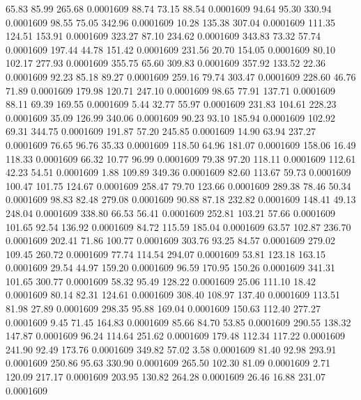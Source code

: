   65.83   85.99  265.68   0.0001609
  88.74   73.15   88.54   0.0001609
  94.64   95.30  330.94   0.0001609
  98.55   75.05  342.96   0.0001609
  10.28  135.38  307.04   0.0001609
 111.35  124.51  153.91   0.0001609
 323.27   87.10  234.62   0.0001609
 343.83   73.32   57.74   0.0001609
 197.44   44.78  151.42   0.0001609
 231.56   20.70  154.05   0.0001609
  80.10  102.17  277.93   0.0001609
 355.75   65.60  309.83   0.0001609
 357.92  133.52   22.36   0.0001609
  92.23   85.18   89.27   0.0001609
 259.16   79.74  303.47   0.0001609
 228.60   46.76   71.89   0.0001609
 179.98  120.71  247.10   0.0001609
  98.65   77.91  137.71   0.0001609
  88.11   69.39  169.55   0.0001609
   5.44   32.77   55.97   0.0001609
 231.83  104.61  228.23   0.0001609
  35.09  126.99  340.06   0.0001609
  90.23   93.10  185.94   0.0001609
 102.92   69.31  344.75   0.0001609
 191.87   57.20  245.85   0.0001609
  14.90   63.94  237.27   0.0001609
  76.65   96.76   35.33   0.0001609
 118.50   64.96  181.07   0.0001609
 158.06   16.49  118.33   0.0001609
  66.32   10.77   96.99   0.0001609
  79.38   97.20  118.11   0.0001609
 112.61   42.23   54.51   0.0001609
   1.88  109.89  349.36   0.0001609
  82.60  113.67   59.73   0.0001609
 100.47  101.75  124.67   0.0001609
 258.47   79.70  123.66   0.0001609
 289.38   78.46   50.34   0.0001609
  98.83   82.48  279.08   0.0001609
  90.88   87.18  232.82   0.0001609
 148.41   49.13  248.04   0.0001609
 338.80   66.53   56.41   0.0001609
 252.81  103.21   57.66   0.0001609
 101.65   92.54  136.92   0.0001609
  84.72  115.59  185.04   0.0001609
  63.57  102.87  236.70   0.0001609
 202.41   71.86  100.77   0.0001609
 303.76   93.25   84.57   0.0001609
 279.02  109.45  260.72   0.0001609
  77.74  114.54  294.07   0.0001609
  53.81  123.18  163.15   0.0001609
  29.54   44.97  159.20   0.0001609
  96.59  170.95  150.26   0.0001609
 341.31  101.65  300.77   0.0001609
  58.32   95.49  128.22   0.0001609
  25.06  111.10   18.42   0.0001609
  80.14   82.31  124.61   0.0001609
 308.40  108.97  137.40   0.0001609
 113.51   81.98   27.89   0.0001609
 298.35   95.88  169.04   0.0001609
 150.63  112.40  277.27   0.0001609
   9.45   71.45  164.83   0.0001609
  85.66   84.70   53.85   0.0001609
 290.55  138.32  147.87   0.0001609
  96.24  114.64  251.62   0.0001609
 179.48  112.34  117.22   0.0001609
 241.90   92.49  173.76   0.0001609
 349.82   57.02    3.58   0.0001609
  81.40   92.98  293.91   0.0001609
 250.86   95.63  330.90   0.0001609
 265.50  102.30   81.09   0.0001609
   2.71  120.09  217.17   0.0001609
 203.95  130.82  264.28   0.0001609
  26.46   16.88  231.07   0.0001609
